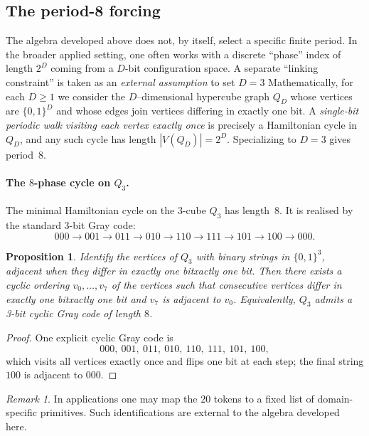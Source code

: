 \documentclass[11pt,reqno]{amsart}
\theoremstyle{plain}
\newtheorem{proposition}[theorem]{Proposition}
\theoremstyle{definition}
\theoremstyle{remark}
\newtheorem{remark}[theorem]{Remark} %
\newcommand{\1}{\mathbf{1}}
\begin{document}

\label{sec:octave}
\subsection{The period-8 forcing} The algebra developed above does not, by itself, select a specific finite
period. In the broader applied setting, one often works
with a discrete ``phase'' index of length $2^D$ coming from a $D$-bit
configuration space. A separate ``linking constraint'' is taken as an
\emph{external assumption} to set $D=3$  Mathematically, for each $D\ge 1$ we consider the
$D$--dimensional hypercube graph $Q_D$ whose vertices are $\{0,1\}^D$ and
whose edges join vertices differing in exactly one bit. A \emph{single-bit periodic walk visiting each vertex exactly once} is
precisely a Hamiltonian cycle in $Q_D$, and any such cycle has length
$|V(Q_D)|=2^D$. Specializing to $D=3$ gives period~$8$. \paragraph{The $8$-phase cycle on $Q_3$.}\label{thm:T7}
The minimal Hamiltonian cycle on the 3-cube $Q_3$ has length~$8$.
It is realised by the standard 3-bit Gray code:
\[ 000\to001\to011\to010\to110\to111\to101\to100\to000.
\]

\begin{proposition}\label{prop:gray-code}
Identify the vertices of $Q_3$ with binary strings in $\{0,1\}^3$, adjacent when
they differ in exactly one bitxactly one bit. Then there exists a cyclic ordering
$v_0,\dots,v_7$ of the vertices such that consecutive vertices differ in exactly one bitxactly
one bit and $v_7$ is adjacent to $v_0$. Equivalently, $Q_3$ admits a
\emph{3-bit cyclic Gray code} of length $8$.
\end{proposition}

\begin{proof}
One explicit cyclic Gray code is
\[
000,\ 001,\ 011,\ 010,\ 110,\ 111,\ 101,\ 100,
\]
which visits all vertices exactly once and flips one bit at each step; the final
string $100$ is adjacent to $000$.
\end{proof} 

\begin{remark}
In applications one may map the $20$ tokens to a fixed list of domain-specific primitives.
Such identifications are external to the algebra developed here.
\end{remark}
\end{document}
